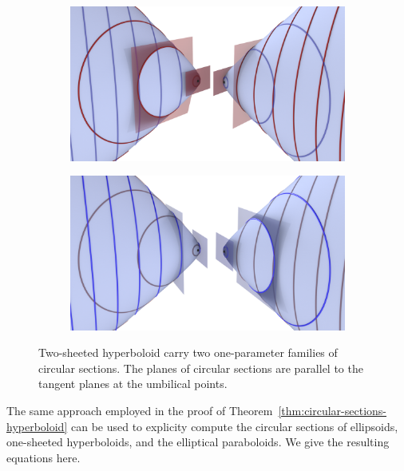 \documentclass[10pt, a4paper]{article}
\theoremstyle{BoldTopSpacing}
\theoremstyle{BoldTopSpacing}
\theoremstyle{BoldTopSpacing}
\theoremstyle{BoldTopBottomSpacing}
\theoremstyle{BoldTopSpacing}
\theoremstyle{BoldTopBottomSpacing}
\theoremstyle{remark}
\begin{document}
\begin{figure}[H]
  \begin{subfigure}[b]{0.5\textwidth}
    \includegraphics[width=\textwidth]{umbilics_two_sheeted_hyperboloid_red.png}
    \label{fig:two_sheeted_red}
  \end{subfigure}
  \hfill
  \begin{subfigure}[b]{0.5\textwidth}
    \includegraphics[width=\textwidth]{umbilics_two_sheeted_hyperboloid_blue.png}
    \label{fig:two_sheeted_blue}
  \end{subfigure}
  \caption[Two one-parameter families of circular sections on two-sheeted hyperboloids]{Two-sheeted hyperboloid carry two one-parameter families of circular sections. The planes of circular sections are parallel to the tangent planes at the umbilical points.}
\end{figure}

The same approach employed in the proof of Theorem~\ref{thm:circular-sections-hyperboloid} can be used to explicity compute the circular sections of ellipsoids, one-sheeted hyperboloids, and the elliptical paraboloids. We give the resulting equations here. \par
\end{document}
